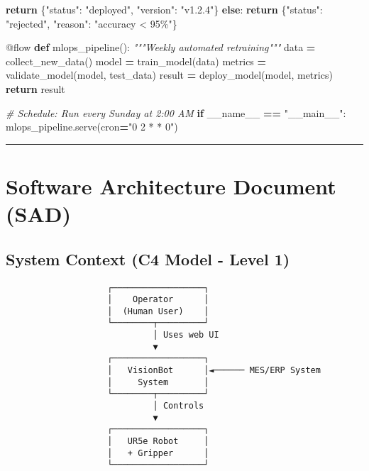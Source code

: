 \documentclass[
]{article}
\newenvironment{Shaded}{\begin{snugshade}}{\end{snugshade}}
\newcommand{\AttributeTok}[1]{\textcolor[rgb]{0.13,0.29,0.53}{#1}}
\newcommand{\CommentTok}[1]{\textcolor[rgb]{0.56,0.35,0.01}{\textit{#1}}}
\newcommand{\ControlFlowTok}[1]{\textcolor[rgb]{0.13,0.29,0.53}{\textbf{#1}}}
\newcommand{\KeywordTok}[1]{\textcolor[rgb]{0.13,0.29,0.53}{\textbf{#1}}}
\newcommand{\NormalTok}[1]{#1}
\newcommand{\OperatorTok}[1]{\textcolor[rgb]{0.81,0.36,0.00}{\textbf{#1}}}
\newcommand{\StringTok}[1]{\textcolor[rgb]{0.31,0.60,0.02}{#1}}
\newcommand{\VariableTok}[1]{\textcolor[rgb]{0.00,0.00,0.00}{#1}}
\begin{document}
\begin{Shaded}
\begin{Highlighting}[]
        \ControlFlowTok{return}\NormalTok{ \{}\StringTok{"status"}\NormalTok{: }\StringTok{"deployed"}\NormalTok{, }\StringTok{"version"}\NormalTok{: }\StringTok{"v1.2.4"}\NormalTok{\}}
    \ControlFlowTok{else}\NormalTok{:}
        \ControlFlowTok{return}\NormalTok{ \{}\StringTok{"status"}\NormalTok{: }\StringTok{"rejected"}\NormalTok{, }\StringTok{"reason"}\NormalTok{: }\StringTok{"accuracy \textless{} 95\%"}\NormalTok{\}}

\AttributeTok{@flow}
\KeywordTok{def}\NormalTok{ mlops\_pipeline():}
    \CommentTok{"""Weekly automated retraining"""}
\NormalTok{    data }\OperatorTok{=}\NormalTok{ collect\_new\_data()}
\NormalTok{    model }\OperatorTok{=}\NormalTok{ train\_model(data)}
\NormalTok{    metrics }\OperatorTok{=}\NormalTok{ validate\_model(model, test\_data)}
\NormalTok{    result }\OperatorTok{=}\NormalTok{ deploy\_model(model, metrics)}
    \ControlFlowTok{return}\NormalTok{ result}

\CommentTok{\# Schedule: Run every Sunday at 2:00 AM}
\ControlFlowTok{if} \VariableTok{\_\_name\_\_} \OperatorTok{==} \StringTok{"\_\_main\_\_"}\NormalTok{:}
\NormalTok{    mlops\_pipeline.serve(cron}\OperatorTok{=}\StringTok{"0 2 * * 0"}\NormalTok{)}
\end{Highlighting}
\end{Shaded}

\begin{center}\rule{0.5\linewidth}{0.5pt}\end{center}

\hypertarget{software-architecture-document-sad}{%
\section{Software Architecture Document
(SAD)}\label{software-architecture-document-sad}}

\hypertarget{system-context-c4-model---level-1}{%
\subsection{System Context (C4 Model - Level
1)}\label{system-context-c4-model---level-1}}

\begin{verbatim}
                    ┌──────────────────┐
                    │    Operator      │
                    │  (Human User)    │
                    └────────┬─────────┘
                             │ Uses web UI
                             ▼
                    ┌──────────────────┐
                    │   VisionBot      │◄────── MES/ERP System
                    │     System       │
                    └────────┬─────────┘
                             │ Controls
                             ▼
                    ┌──────────────────┐
                    │   UR5e Robot     │
                    │   + Gripper      │
                    └──────────────────┘
\end{verbatim}
\end{document}
